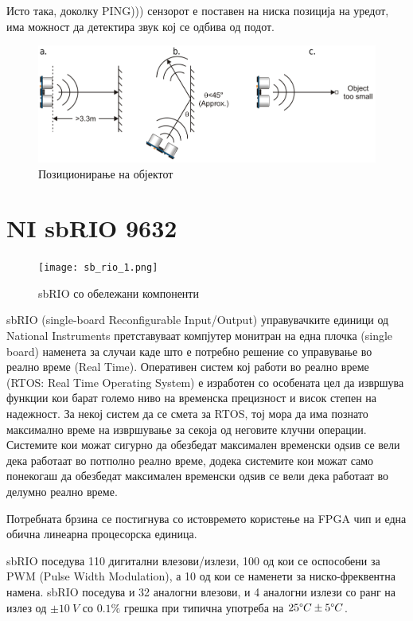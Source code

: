 \documentclass{article}
\begin{document}
Исто така, доколку PING))) сензорот е поставен на ниска позиција на уредот, има можност да детектира звук кој се одбива од подот.

\begin{figure}[H]
\includegraphics[width=0.75\linewidth]{ping_obj.png}
\centering
\caption{Позиционирање на објектот}
\label{fig:ping_obj.png}
\end{figure}
\newpage

\section{NI sbRIO 9632}
\begin{figure}[h]
\centering
\texttt{[image: sb\_rio\_1.png]}
\caption{sbRIO со обележани компоненти}
\label{fig:sb_rio_1.png}
\end{figure}

sbRIO (single-board Reconfigurable Input/Output) управувачките единици од National Instruments претставуваат компјутер монитран на една плочка (single board) наменета за случаи каде што е потребно решение со управување во реално време (Real Time). Оперативен систем кој работи во реално време (RTOS: Real Time Operating System) е изработен со особената цел да извршува функции кои барат големо ниво на временска прецизност и висок степен на надежност. За некој систем да се смета за RTOS, тој мора да има познато максимално време на извршување за секоја од неговите клучни операции. Системите кои можат сигурно да обезбедат максимален временски одѕив се вели дека работаат во потполно реално време, додека системите кои можат само понекогаш да обезбедат максимален временски одѕив се вели дека работаат во делумно реално време.
 
Потребната брзина се постигнува со истовремето користење на FPGA чип и една обична линеарна процесорска единица. 

sbRIO поседува 110 дигитални влезови/излези, 100 од кои се оспособени за PWM (Pulse Width Modulation), а 10 од кои се наменети за ниско-фреквентна намена. sbRIO поседува и 32 аналогни влезови, и 4 аналогни излези со ранг на излез од $ \pm 10\ V$ со $0.1\%$ грешка при типична употреба на $25\degree C \pm5\degree C$.
\end{document}
